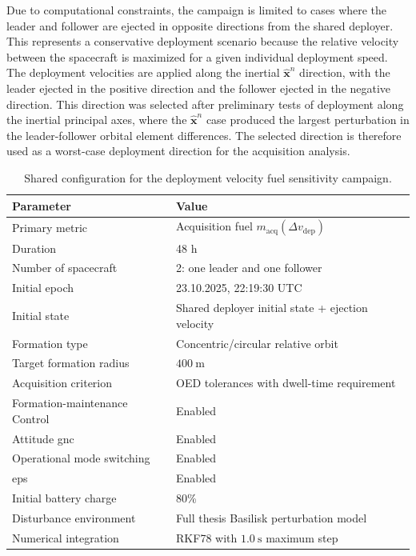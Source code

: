 Due to computational constraints, the campaign is limited to cases where the leader and follower are ejected in opposite directions from the shared deployer. This represents a conservative deployment scenario because the relative velocity between the spacecraft is maximized for a given individual deployment speed. The deployment velocities are applied along the inertial $\hat{\mathbf{x}}^n$ direction, with the leader ejected in the positive direction and the follower ejected in the negative direction. This direction was selected after preliminary tests of deployment along the inertial principal axes, where the $\hat{\mathbf{x}}^n$ case produced the largest perturbation in the leader-follower orbital element differences. The selected direction is therefore used as a worst-case deployment direction for the acquisition analysis.

\begin{table}[H]
    \centering
    \caption{Shared configuration for the deployment velocity fuel sensitivity campaign.}
    \label{tab:deployment_sensitivity_shared_config}
    \begin{tabular}{ll}
        \toprule
        \textbf{Parameter} & \textbf{Value} \\
        \midrule
        Primary metric & Acquisition fuel $m_{\mathrm{acq}}(\Delta v_{\mathrm{dep}})$ \\
        Duration & 48 h \\
        Number of spacecraft & 2: one leader and one follower \\
        Initial epoch & 23.10.2025,  22:19:30 UTC \\
        Initial state & Shared deployer initial state + ejection velocity \\
        Formation type & Concentric/circular relative orbit \\
        Target formation radius & $400~\mathrm{m}$ \\
        Acquisition criterion & OED tolerances with dwell-time requirement \\
        Formation-maintenance Control & Enabled \\
        Attitude \gls{gnc} & Enabled \\
        Operational mode switching & Enabled \\
        \gls{eps} & Enabled \\
        Initial battery charge & 80\% \\
        Disturbance environment & Full thesis Basilisk perturbation model \\
        Numerical integration & RKF78 with $1.0~\mathrm{s}$ maximum step \\
        \bottomrule
    \end{tabular}
\end{table}

